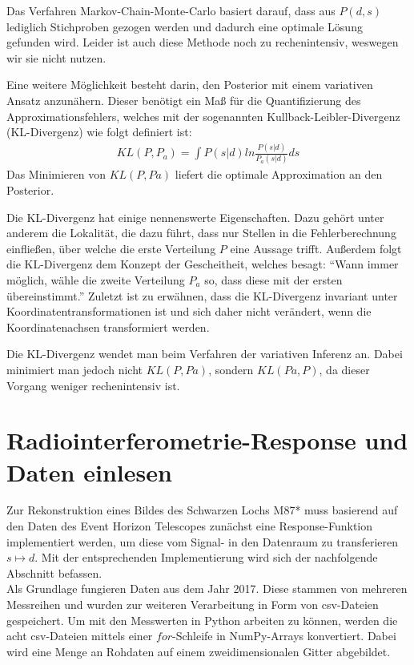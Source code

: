 \documentclass[]{dsadokumentation}
\begin{document}
Das Verfahren Markov-Chain-Monte-Carlo basiert darauf, dass aus $P(d,s)$ lediglich Stichproben gezogen werden und dadurch eine optimale Lösung gefunden wird. Leider ist auch diese Methode noch zu rechenintensiv, weswegen wir sie nicht nutzen.

Eine weitere Möglichkeit besteht darin, den Posterior mit einem variativen Ansatz anzunähern. Dieser benötigt ein Maß für die Quantifizierung des Approximationsfehlers, welches mit der sogenannten Kullback-Leibler-Divergenz (KL-Divergenz) wie folgt definiert ist:
\begin{eqnarray}
KL(P,P_a) = \int P(s|d) ln \frac{P(s|d)}{P_a(s|d)}ds
\end{eqnarray}
Das Minimieren von $KL(P, Pa)$ liefert die optimale Approximation an den Posterior.

Die KL-Divergenz hat einige nennenswerte Eigenschaften. Dazu gehört unter anderem die Lokalität, die dazu führt, dass nur Stellen in die Fehlerberechnung einfließen, über welche die erste Verteilung $P$ eine Aussage trifft. Außerdem folgt die KL-Divergenz dem Konzept der Gescheitheit, welches besagt: \enquote{Wann immer möglich, wähle die zweite Verteilung $P_a$ so, dass diese mit der ersten übereinstimmt.} Zuletzt ist zu erwähnen, dass die KL-Divergenz invariant unter Koordinatentransformationen ist und sich daher nicht verändert, wenn die Koordinatenachsen transformiert werden.

Die KL-Divergenz wendet man beim Verfahren der variativen Inferenz an. Dabei minimiert man jedoch nicht $KL(P, Pa)$, sondern $KL(Pa, P)$, da dieser Vorgang weniger rechenintensiv ist.

\section{Radiointerferometrie-Response und Daten einlesen}%

Zur Rekonstruktion eines Bildes des Schwarzen Lochs M87* muss basierend auf den Daten des Event Horizon Telescopes zunächst eine Response-Funktion implementiert werden, um diese vom Signal- in den Datenraum zu transferieren $s \mapsto d$. Mit der entsprechenden Implementierung wird sich der nachfolgende Abschnitt befassen.\\

Als Grundlage fungieren Daten aus dem Jahr 2017. Diese stammen von mehreren Messreihen und wurden zur weiteren Verarbeitung in Form von csv-Dateien gespeichert.
Um mit den Messwerten in Python arbeiten zu können, werden die acht csv-Dateien mittels einer $for$-Schleife in NumPy-Arrays konvertiert. Dabei wird eine Menge an Rohdaten auf einem zweidimensionalen Gitter abgebildet.\\
\end{document}
